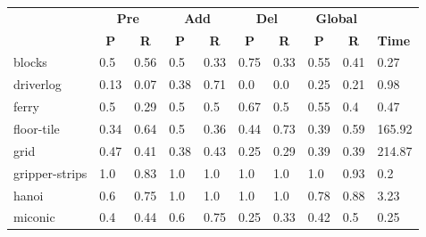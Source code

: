 \begin{table}[hbt!]
  \begin{center}
    \begin{footnotesize}
		\begin{tabular}{l|l|l|l|l|l|l||l|l||l|}
			& \multicolumn{2}{|c|}{\bf Pre} & \multicolumn{2}{|c|}{\bf Add} & \multicolumn{2}{|c||}{\bf Del} & \multicolumn{2}{|c|}{\bf Global} & \\ \cline{2-9}			
			& \multicolumn{1}{|c|}{\bf P} & \multicolumn{1}{|c|}{\bf R} & \multicolumn{1}{|c|}{\bf P} & \multicolumn{1}{|c|}{\bf R} & \multicolumn{1}{|c|}{\bf P} & \multicolumn{1}{|c||}{\bf R} &  \multicolumn{1}{|c|}{\bf P} & \multicolumn{1}{|c|}{\bf R} & {\bf Time} \\
			\hline
			blocks & 0.5 & 0.56 & 0.5 & 0.33 & 0.75 & 0.33 & 0.55 & 0.41& 0.27 \\ %
			driverlog & 0.13 & 0.07 & 0.38 & 0.71 & 0.0 & 0.0 & 0.25 & 0.21& 0.98 \\ %
			ferry & 0.5 & 0.29 & 0.5 & 0.5 & 0.67 & 0.5 & 0.55 & 0.4& 0.47 \\ %
			floor-tile & 0.34 & 0.64 & 0.5 & 0.36 & 0.44 & 0.73 & 0.39 & 0.59& 165.92 \\ %
			grid & 0.47 & 0.41 & 0.38 & 0.43 & 0.25 & 0.29 & 0.39 & 0.39& 214.87 \\ %
			gripper-strips & 1.0 & 0.83 & 1.0 & 1.0 & 1.0 & 1.0 & 1.0 & 0.93& 0.2 \\ %
			hanoi & 0.6 & 0.75 & 1.0 & 1.0 & 1.0 & 1.0 & 0.78 & 0.88& 3.23 \\ %
			miconic & 0.4 & 0.44 & 0.6 & 0.75 & 0.25 & 0.33 & 0.42 & 0.5& 0.25 \\ %

\end{tabular}
\end{footnotesize}
\end{center}
\end{table}
